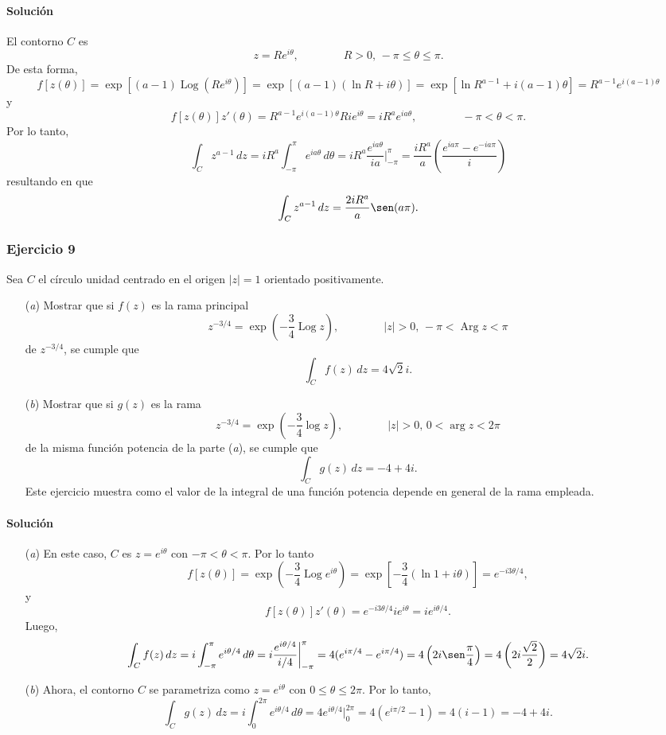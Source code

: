 \documentclass[a4paper]{report}
\DeclareMathOperator{\Arg}{Arg}
\DeclareMathOperator{\Log}{Log}
\begin{document}
\paragraph{Solución} El contorno \(C\) es
\[
 z=Re^{i\theta},
 \qquad\qquad
 R>0,\,-\pi\leq\theta\leq\pi.
\]
De esta forma,
\[
 f[z(\theta)]=\exp\left[(a-1)\Log(Re^{i\theta})\right]=\exp\left[(a-1)(\ln R+i\theta)\right]
  =\exp\left[\ln R^{a-1}+i(a-1)\theta\right]=R^{a-1}e^{i(a-1)\theta}
\]
y
\begin{equation}\label{eq:exercise_46_08_integrand}
  f[z(\theta)]z'(\theta)=R^{a-1}e^{i(a-1)\theta}Rie^{i\theta}=iR^ae^{ia\theta},
 \qquad\qquad
 -\pi<\theta<\pi.
\end{equation}
Por lo tanto,
\[
 \int_C z^{a-1}\,dz=iR^a\int_{-\pi}^{\pi}e^{ia\theta}\,d\theta=iR^a\frac{e^{ia\theta}}{ia}\bigg|_{-\pi}^{\pi}
  =\frac{iR^a}{a}\left(\frac{e^{ia\pi}-e^{-ia\pi}}{i}\right)
\]
resultando en que 
\[
 \int_C z^{a-1}\,dz=\frac{2iR^a}{a}\sen(a\pi).
\]

\subsubsection{Ejercicio 9}

Sea \(C\) el círculo unidad centrado en el origen \(|z|=1\) orientado positivamente.
\begin{enumerate}
 \item[(\textit{a})] Mostrar que si \(f(z)\) es la rama principal
 \[
  z^{-3/4}=\exp\left(-\frac{3}{4}\Log z\right),
 \qquad\qquad
 |z|>0,\,-\pi<\Arg z<\pi
 \]
 de \(z^{-3/4}\), se cumple que 
 \[
  \int_Cf(z)\,dz=4\sqrt{2}i.
 \]
 \item[(\textit{b})] Mostrar que si \(g(z)\) es la rama
 \[
  z^{-3/4}=\exp\left(-\frac{3}{4}\log z\right),
 \qquad\qquad
 |z|>0,\,0<\arg z<2\pi
 \]
 de la misma función potencia de la parte (\textit{a}), se cumple que 
 \[
  \int_Cg(z)\,dz=-4+4i.
 \]
 Este ejercicio muestra como el valor de la integral de una función potencia depende en general de la rama empleada.
\end{enumerate}

\paragraph{Solución}
\begin{enumerate}
 \item[(\textit{a})] En este caso, \(C\) es \(z=e^{i\theta}\) con \(-\pi<\theta<\pi\). Por lo tanto
 \[
  f[z(\theta)]=\exp\left(-\frac{3}{4}\Log e^{i\theta}\right)=\exp\left[-\frac{3}{4}(\ln1+i\theta)\right]=e^{-i3\theta/4},
 \]
 y
 \[
  f[z(\theta)]z'(\theta)=e^{-i3\theta/4}ie^{i\theta}=ie^{i\theta/4}.
 \]
 Luego,
 \[
  \int_Cf(z)\,dz=i\int_{-\pi}^\pi e^{i\theta/4}\,d\theta=i\frac{e^{i\theta/4}}{i/4}\bigg|_{-\pi}^\pi=4(e^{i\pi/4}-e^{i\pi/4})=4\left(2i\sen\frac{\pi}{4}\right)=4\left(2i\frac{\sqrt{2}}{2}\right)=4\sqrt{2}i.
 \]
 \item[(\textit{b})] Ahora, el contorno \(C\) se parametriza como \(z=e^{i\theta}\) con \(0\leq\theta\leq2\pi\). Por lo tanto, 
 \[
  \int_Cg(z)\,dz=i\int_0^{2\pi}e^{i\theta/4}\,d\theta=4e^{i\theta/4}\bigg|_0^{2\pi}=4(e^{i\pi/2}-1)=4(i-1)=-4+4i.
 \]
\end{enumerate}
\end{document}
